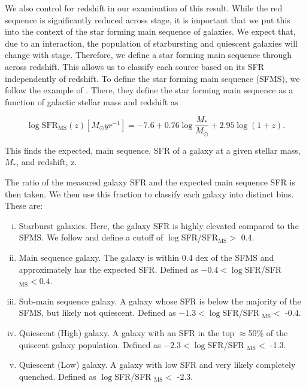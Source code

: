 \documentclass[fleqn,usenatbib]{mnras}
\begin{document}
We also control for redshift in our examination of this result. While the red sequence is significantly reduced across stage, it is important that we put this into the context of the star forming main sequence of galaxies. We expect that, due to an interaction, the population of starbursting and quiescent galaxies will change with stage. Therefore, we define a star forming main sequence through across redshift. This allows us to classify each source based on its SFR independently of redshift. To define the star forming main sequence (SFMS), we follow the example of \citet{2019MNRAS.484.4360A}. There, they define the star forming main sequence as a function of galactic stellar mass and redshift as

\begin{equation}
    \log \text{SFR}_{\text{MS}}(z)[M_\odot yr^{-1}] = -7.6 + 0.76\log\frac{M_*}{M_\odot} + 2.95\log(1+z).
\end{equation}

\noindent This finds the expected, main sequence, SFR of a galaxy at a given stellar mass, $M_*$, and redshift, z.

The ratio of the measured galaxy SFR and the expected main sequence SFR is then taken. We then use this fraction to classify each galaxy into distinct bins. These are:

\begin{enumerate}[(i)]
    \item Starburst galaxies. Here, the galaxy SFR is highly elevated compared to the SFMS. We follow \citet{2019MNRAS.484.4360A} and define a cutoff of $\log$SFR/SFR$_{\text{MS}} >$ 0.4.
    \item Main sequence galaxy. The galaxy is within 0.4 dex of the SFMS and approximately has the expected SFR. Defined as $-0.4 < \log$SFR/SFR$_{\text{MS}} < 0.4$.
    \item Sub-main sequence galaxy. A galaxy whose SFR is below the majority of the SFMS, but likely not quiescent. Defined as $-1.3 < \log$SFR/SFR $_{\text{MS}} < $ -0.4.
    \item Quiescent (High) galaxy. A galaxy with an SFR in the top $\approx$50\% of the quiscent galaxy population. Defined as $-2.3 < \log$SFR/SFR $_{\text{MS}} <$ -1.3.
    \item Quiescent (Low) galaxy. A galaxy with low SFR and very likely completely quenched. Defined as $\log$SFR/SFR $_{\text{MS}} <$ -2.3.
\end{enumerate}
\end{document}
